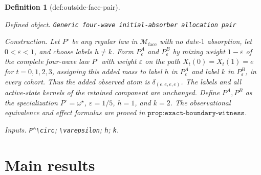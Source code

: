 \documentclass{article}
\newtheorem{definition}{Definition}
\begin{document}
\begin{definition}[def:outside-face-pair]\label{def:outside-face-pair}
\par\smallskip\noindent\emph{Defined object.} \texttt{Generic four-\allowbreak{}wave initial-\allowbreak{}absorber allocation pair}
\par\smallskip\noindent\emph{Construction.} Let \(P^\circ\) be any regular law in \(\mathcal M_{\mathrm{face}}\) with no date-\(1\) absorption, let \(0<\varepsilon<1\), and choose labels \(h\neq k\). Form \(P_\varepsilon^A\) and \(P_\varepsilon^B\) by mixing weight \(1-\varepsilon\) of the complete four-wave law \(P^\circ\) with weight \(\varepsilon\) on the path \(X_t(0)=X_t(1)=e\) for \(t=0,1,2,3\), assigning this added mass to label \(h\) in \(P_\varepsilon^A\) and label \(k\) in \(P_\varepsilon^B\), in every cohort. Thus the added observed atom is \(\delta_{(e,e,e,e)}\). The labels and all active-state kernels of the retained component are unchanged. Define \(P^A,P^B\) as the specialization \(P^\circ=\omega^\star\), \(\varepsilon=1/5\), \(h=1\), and \(k=2\). The observational equivalence and effect formulas are proved in \(\texttt{prop:exact-boundary-witness}\).
\par\smallskip\noindent\emph{Inputs.} \texttt{P\textasciicircum{}\textbackslash{}\allowbreak{}circ}; \texttt{\textbackslash{}\allowbreak{}varepsilon}; \texttt{h}; \texttt{k}.
\end{definition}

\section{Main results}
\end{document}
